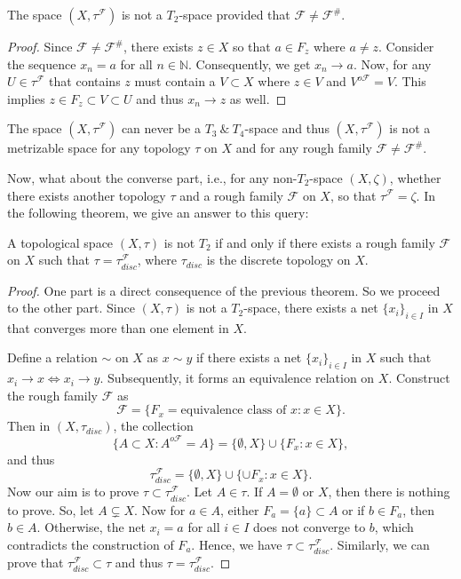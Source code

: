 \documentclass[11pt]{amsart}
\begin{document}
\begin{theorem}
     The space $\left(X,\tau^\mathscr{F}\right)$ is not a $T_2$-space provided that $\mathscr{F} \neq \mathscr{F^\#}$.
\end{theorem}
\begin{proof}
    Since  $\mathscr{F} \neq \mathscr{F^\#}$, there exists $z\in X$ so that $a\in F_z$ where $a\neq z$. Consider the sequence $x_n=a$ for all $n\in \mathbb{N}$. Consequently, we get  $x_n\rightarrow a$. Now, for any $U\in \tau^{\mathscr{F}}$ that contains $z$ must contain a $V\subset X$ where $z\in V$ and ${V}^{o\mathscr{F}}=V$. This implies $z\in F_z\subset V\subset U$ and thus $x_n\rightarrow z$ as well. 
\end{proof}

\begin{corollary}
     The space $\left(X,\tau^\mathscr{F}\right)$ can never be a $T_3 ~\&~T_4$-space and thus $\left(X,\tau^\mathscr{F}\right)$ is not a metrizable space for any topology $\tau$ on $X$ and for any rough family $\mathscr{F} \neq \mathscr{F^\#}$.
\end{corollary}

Now, what about the converse part, i.e., for any non-$T_2$-space $(X,\zeta)$, whether there exists another topology $\tau$ and a rough family $\mathscr{F}$ on $X$, so that $\tau^\mathscr{F}=\zeta$. In the following theorem, we give an answer to this query:


\begin{theorem}
    A topological space $(X,\tau)$ is not $T_2$ if and only if there exists a rough family $\mathscr{F}$ on $X$ such that $\tau=\tau_{disc}^\mathscr{F}$, where $\tau_{disc}$ is the discrete topology on $X$.
\end{theorem}
\begin{proof} One part is a direct consequence of the previous theorem. So we proceed to the other part. Since $(X,\tau)$ is not a $T_2$-space, there exists a net $\{x_i\}_{i\in I}$ in $X$ that converges more than one element in $X$.

    Define a relation $\sim$ on $X$ as $x\sim y$ if there exists a net $\{x_i\}_{i\in I}$ in $X$ such that $x_i\rightarrow x\iff x_i\rightarrow y$. Subsequently, it forms an equivalence relation on $X$. Construct the rough family $\mathscr{F}$ as \[\mathscr{F}=\{F_x=\text{equivalence class of }x: x\in X\}.\]
    Then in $(X,\tau_{disc})$, the collection $$\{A\subset X: A^{o\mathscr{F}}=A\}=\{\emptyset, X\}\cup\{F_x: x\in X\},$$ and thus $$\tau_{disc}^\mathscr{F}=\{\emptyset, X\}\cup\{\cup F_x: x\in X\}.$$ Now our aim is to prove $\tau\subset \tau_{disc}^\mathscr{F}$. Let $A\in \tau$. If $A=\emptyset\text{ or }X$, then there is nothing to prove. So, let $A\subsetneq X$. Now for $a\in A$, either $F_a=\{a\}\subset A$ or if $b\in F_a$, then $b\in A$. Otherwise, the net $x_i=a$ for all $i\in I$ does not converge to $b$, which contradicts the construction of $F_a$. Hence, we have $\tau \subset \tau_{disc}^\mathscr{F}$. Similarly, we can prove that $\tau_{disc}^\mathscr{F}\subset \tau$ and thus $\tau=\tau_{disc}^\mathscr{F}$. 
\end{proof}
\end{document}

